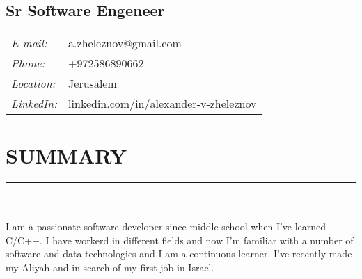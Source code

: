 \documentclass[a4paper,oneside,12pt]{article}
\newcommand{\cvpart}[1]{%
\vspace{-1em}%
\section*{\large\bfseries\MakeTextUppercase{#1}}%
\vspace{-1em}%
\rule{\linewidth}{0.3em}\\[-.3em]%
}
\begin{document}
\begin{flushleft}
\vspace{-3em}{\Huge\bfseries Alexander Zheleznov }

~\\[-.5em]
\begin{multicols}{2}

\section*{\Large\bfseries Sr Software Engeneer}%
\columnbreak
\begin{tabularx}{\linewidth}{ll}
{\it E-mail:}		& a.zheleznov@gmail.com\\
{\it Phone:}	    & {\small +972586890662} \\
{\it Location:}		& Jerusalem\\
{\it LinkedIn:}		& linkedin.com/in/alexander-v-zheleznov\\
\end{tabularx}
\end{multicols}
\end{flushleft}

\cvpart{Summary}
~\\
I am a passionate software developer since middle school when I've learned  C/C++. 
I have workerd in different fields and now I'm familiar with a number of software and data technologies and I am a continuous learner.
I've recently made my Aliyah and in search of my first job in Israel.

~\\
\end{document}

